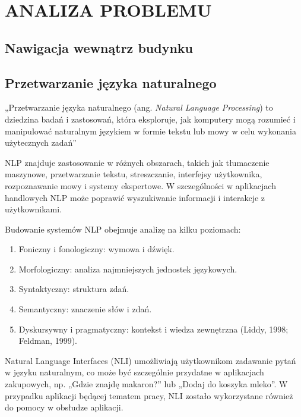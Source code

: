 \chapter{ANALIZA PROBLEMU}
\label{chapter:analiza_problemu}

\section{Nawigacja wewnątrz budynku}

\section{Przetwarzanie języka naturalnego}

„Przetwarzanie języka naturalnego (ang. \textit{Natural Language Processing}) to dziedzina badań i zastosowań, która eksploruje, jak komputery mogą rozumieć i manipulować naturalnym językiem w formie tekstu lub mowy w celu wykonania użytecznych zadań” \\ \cite{Chowdhary2020} 


NLP znajduje zastosowanie w różnych obszarach, takich jak tłumaczenie maszynowe, przetwarzanie tekstu, streszczanie, interfejsy użytkownika, rozpoznawanie mowy i systemy ekspertowe. W szczególności w aplikacjach handlowych NLP może poprawić wyszukiwanie informacji i interakcje z użytkownikami.

Budowanie systemów NLP obejmuje analizę na kilku poziomach:
\begin{enumerate}
    \item Foniczny i fonologiczny: wymowa i dźwięk.
    \item Morfologiczny: analiza najmniejszych jednostek językowych.
    \item Syntaktyczny: struktura zdań.
    \item Semantyczny: znaczenie słów i zdań.
    \item Dyskursywny i pragmatyczny: kontekst i wiedza zewnętrzna (Liddy, 1998; Feldman, 1999). \cite{Chowdhary2020}
\end{enumerate}

Natural Language Interfaces (NLI) umożliwiają użytkownikom zadawanie pytań w języku naturalnym, co może być szczególnie przydatne w aplikacjach zakupowych, np. „Gdzie znajdę makaron?” lub „Dodaj do koszyka mleko”. W przypadku aplikacji będącej tematem pracy, NLI zostało wykorzystane również do pomocy w obsłudze aplikacji.
